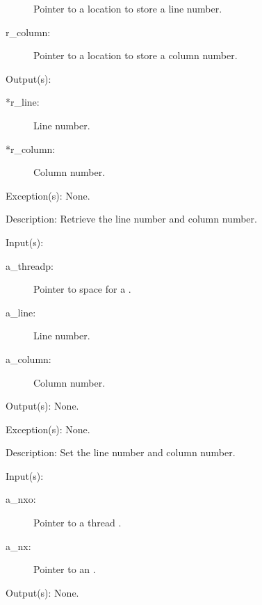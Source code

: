 \begin{capi}
\begin{capilist}
\begin{description}
			Pointer to a location to store a line number.
		\item[r\_column: ]
			Pointer to a location to store a column number.
		\end{description}
	\item[Output(s): ]
		\begin{description}\item[]
		\item[*r\_line: ]
			Line number.
		\item[*r\_column: ]
			Column number.
		\end{description}
	\item[Exception(s): ] None.
	\item[Description: ]
		Retrieve the line number and column number.
	\end{capilist}
\label{nxo_threadp_position_set}
	\begin{capilist}
	\item[Input(s): ]
		\begin{description}\item[]
		\item[a\_threadp: ]
			Pointer to space for a .
		\item[a\_line: ]
			Line number.
		\item[a\_column: ]
			Column number.
		\end{description}
	\item[Output(s): ] None.
	\item[Exception(s): ] None.
	\item[Description: ]
		Set the line number and column number.
	\end{capilist}
\label{nxo_thread_new}
	\begin{capilist}
	\item[Input(s): ]
		\begin{description}\item[]
		\item[a\_nxo: ]
			Pointer to a thread \classname{nxo}.
		\item[a\_nx: ]
			Pointer to an \classname{nx}.
		\end{description}
	\item[Output(s): ] None.

\end{capilist}
\end{capi}

